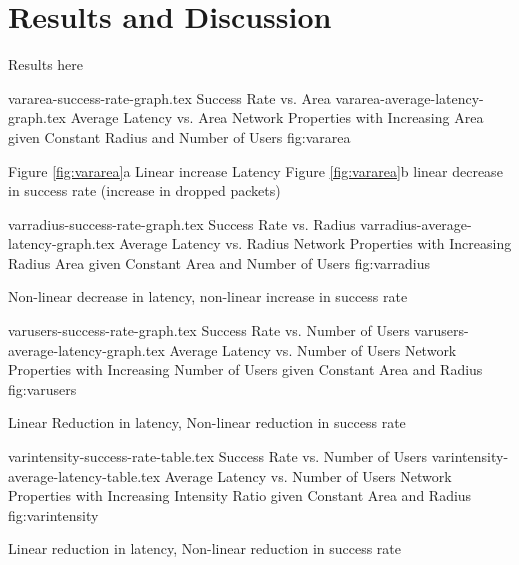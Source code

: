 \section{Results and Discussion}
Results here

\sidebysidefigures
{vararea-success-rate-graph.tex}       {Success Rate vs. Area}
{vararea-average-latency-graph.tex}    {Average Latency vs. Area}
{Network Properties with Increasing Area given Constant Radius and Number of Users}
{fig:vararea}

Figure \ref{fig:vararea}a Linear increase Latency
Figure \ref{fig:vararea}b linear decrease in success rate (increase in dropped packets)

\sidebysidefigures
{varradius-success-rate-graph.tex}     {Success Rate vs. Radius}
{varradius-average-latency-graph.tex}  {Average Latency vs. Radius}
{Network Properties with Increasing Radius Area given Constant Area and Number of Users}
{fig:varradius}

Non-linear decrease in latency, non-linear increase in success rate

\sidebysidefigures
{varusers-success-rate-graph.tex}      {Success Rate vs. Number of Users}
{varusers-average-latency-graph.tex}   {Average Latency vs. Number of Users}
{Network Properties with Increasing Number of Users given Constant Area and Radius}
{fig:varusers}

Linear Reduction in latency, Non-linear reduction in success rate

\sidebysidefigures
{varintensity-success-rate-table.tex}      {Success Rate vs. Number of Users}
{varintensity-average-latency-table.tex}   {Average Latency vs. Number of Users}
{Network Properties with Increasing Intensity Ratio given Constant Area and Radius}
{fig:varintensity}

Linear reduction in latency, Non-linear reduction in success rate
